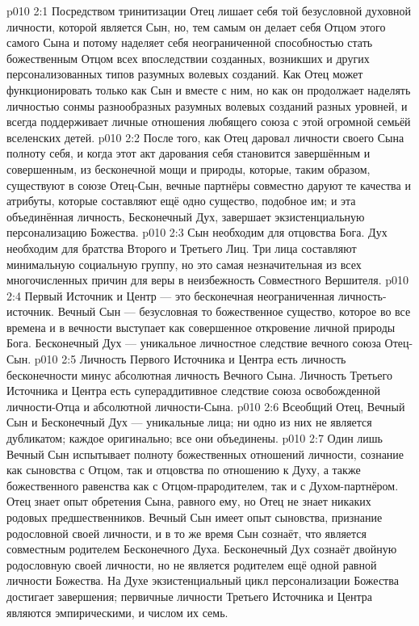 \vs p010 2:1 Посредством тринитизации Отец лишает себя той безусловной духовной личности, которой является Сын, но, тем самым он делает себя Отцом этого самого Сына и потому наделяет себя неограниченной способностью стать божественным Отцом всех впоследствии созданных, возникших и  других персонализованных типов разумных волевых созданий. Как  Отец может функционировать только как Сын и вместе с ним, но как  он продолжает наделять личностью сонмы разнообразных разумных волевых созданий разных уровней, и всегда поддерживает личные отношения любящего союза с этой огромной семьёй вселенских детей.
\vs p010 2:2 После того, как Отец даровал личности своего Сына полноту себя, и когда этот акт дарования себя становится завершённым и совершенным, из бесконечной мощи и природы, которые, таким образом, существуют в союзе Отец\hyp{}Сын, вечные партнёры совместно даруют те качества и атрибуты, которые составляют ещё одно существо, подобное им; и эта объединённая личность, Бесконечный Дух, завершает экзистенциальную персонализацию Божества.
\vs p010 2:3 Сын необходим для отцовства Бога. Дух необходим для братства Второго и Третьего Лиц. Три лица составляют минимальную социальную группу, но это самая незначительная из всех многочисленных причин для веры в неизбежность Совместного Вершителя.
\vs p010 2:4 \pc Первый Источник и Центр --- это бесконечная  неограниченная личность\hyp{}источник. Вечный Сын --- безусловная  то божественное существо, которое во все времена и в вечности выступает как совершенное откровение личной природы Бога. Бесконечный Дух ---  уникальное личностное следствие вечного союза Отец\hyp{}Сын.
\vs p010 2:5 \pc Личность Первого Источника и Центра есть личность бесконечности минус абсолютная личность Вечного Сына. Личность Третьего Источника и Центра есть супераддитивное следствие союза освобожденной личности\hyp{}Отца и абсолютной личности\hyp{}Сына.
\vs p010 2:6 \pc Всеобщий Отец, Вечный Сын и Бесконечный Дух --- уникальные лица; ни одно из них не является дубликатом; каждое оригинально; все они объединены.
\vs p010 2:7 \pc Один лишь Вечный Сын испытывает полноту божественных отношений личности, сознание как сыновства с Отцом, так и отцовства по отношению к Духу, а также божественного равенства как с Отцом\hyp{}прародителем, так и с Духом\hyp{}партнёром. Отец знает опыт обретения Сына, равного ему, но Отец не знает никаких родовых предшественников. Вечный Сын имеет опыт сыновства, признание родословной своей личности, и в то же время Сын сознаёт, что является совместным родителем Бесконечного Духа. Бесконечный Дух сознаёт двойную родословную своей личности, но не является родителем ещё одной равной личности Божества. На Духе экзистенциальный цикл персонализации Божества достигает завершения; первичные личности Третьего Источника и Центра являются эмпирическими, и числом их семь.
